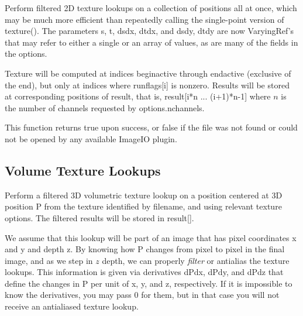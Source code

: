 Perform filtered 2D texture lookups on a collection of positions all at
once, which may be much more efficient than repeatedly calling the
single-point version of {\cf texture()}.  The parameters {\cf s},
{\cf t}, {\cf dsdx}, {\cf dtdx}, and {\cf dsdy}, {\cf dtdy} are now
{\cf VaryingRef}'s that may refer to either a single or an array of
values, as are many of the fields in the {\cf options}.

Texture will be computed at indices {\cf beginactive} through
{\cf endactive} (exclusive of the end), but only at indices where {\cf runflags[i]}
is nonzero.  Results will be stored at corresponding positions of
{\cf result}, that is, 
{\cf result[i*n ... (i+1)*n-1]} where $n$ is the number of channels
requested by {\cf options.nchannels}.

This function returns {\cf true} upon success, or {\cf false} if the
file was not found or could not be opened by any available ImageIO
plugin.
\apiend

\subsection{Volume Texture Lookups}
\label{sec:texturesys:api:texture3d}


Perform a filtered 3D volumetric texture lookup on a position centered at
3D position {\cf P} from the texture identified by
{\cf filename}, and using relevant texture {\cf options}.  The filtered
results will be stored in {\cf result[]}.

We assume that this lookup will be part of an image that has pixel
coordinates {\cf x} and {\cf y} and depth {\cf z}.  
By knowing how {\cf P} changes from
pixel to pixel in the final image, and as we step in $z$ depth, we can properly \emph{filter} or
antialias the texture lookups.  This information is given via
derivatives {\cf dPdx}, {\cf dPdy}, and {\cf dPdz} that define the changes in {\cf P}
per unit of {\cf x}, {\cf y}, and {\cf z}, respectively.  If it is impossible to
know the derivatives, you may pass 0 for them, but in that case you will
not receive an antialiased texture lookup.

